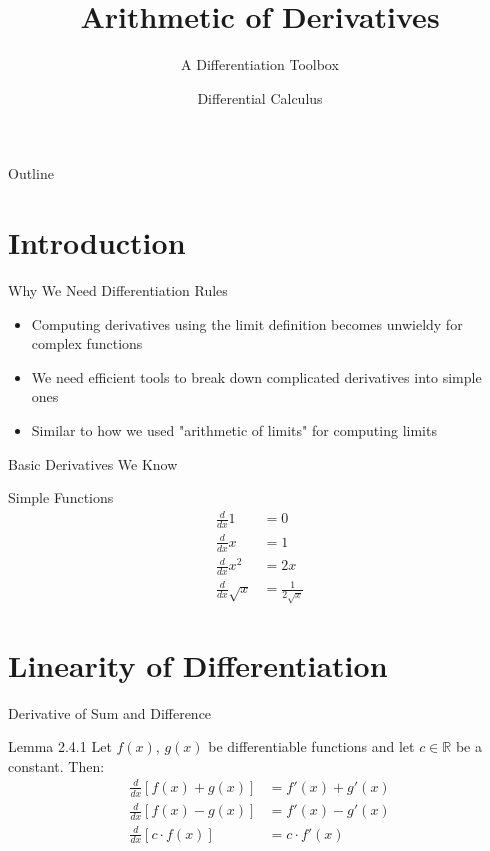 \documentclass[aspectratio=169]{beamer}
\title{Arithmetic of Derivatives}
\subtitle{A Differentiation Toolbox}
\author{Differential Calculus}
\date{}
\begin{document}
\begin{frame}
\titlepage
\end{frame}

\begin{frame}{Outline}
\tableofcontents
\end{frame}

\section{Introduction}

\begin{frame}{Why We Need Differentiation Rules}
\begin{itemize}
  \item Computing derivatives using the limit definition becomes unwieldy for complex functions
  \item We need efficient tools to break down complicated derivatives into simple ones
  \item Similar to how we used "arithmetic of limits" for computing limits
\end{itemize}
\end{frame}

\begin{frame}{Basic Derivatives We Know}
\begin{block}{Simple Functions}
\[
\begin{aligned}
  \frac{d}{dx} 1 &= 0 \\
  \frac{d}{dx} x &= 1 \\
  \frac{d}{dx} x^2 &= 2x \\
  \frac{d}{dx} \sqrt{x} &= \frac{1}{2\sqrt{x}}
\end{aligned}
\]
\end{block}
\end{frame}

\section{Linearity of Differentiation}

\begin{frame}{Derivative of Sum and Difference}
\begin{block}{Lemma 2.4.1}
Let $f(x)$, $g(x)$ be differentiable functions and let $c \in \mathbb{R}$ be a constant. Then:
\[
\begin{aligned}
  \frac{d}{dx}[f(x) + g(x)] &= f'(x) + g'(x) \\
  \frac{d}{dx}[f(x) - g(x)] &= f'(x) - g'(x) \\
  \frac{d}{dx}[c \cdot f(x)] &= c \cdot f'(x)
\end{aligned}
\]
\end{block}
\end{frame}
\end{document}
